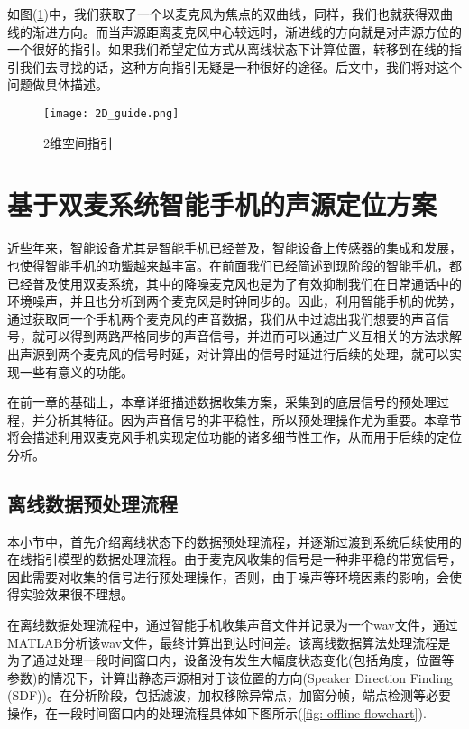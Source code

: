 \documentclass[winfonts,oneside]{njuthesis}
\begin{document}
		如图(\ref{fig: 2D_guide})中，我们获取了一个以麦克风为焦点的双曲线，同样，我们也就获得双曲线的渐进方向。而当声源距离麦克风中心较远时，渐进线的方向就是对声源方位的一个很好的指引。如果我们希望定位方式从离线状态下计算位置，转移到在线的指引我们去寻找的话，这种方向指引无疑是一种很好的途径。后文中，我们将对这个问题做具体描述。
		
		\begin{figure}[H]
			\centering
			\texttt{[image: 2D\_guide.png]} 
			\caption{2维空间指引}
			\label{fig: 2D_guide}
		\end{figure}
	
\chapter{基于双麦系统智能手机的声源定位方案}\label{chapter_work}
	
	近些年来，智能设备尤其是智能手机已经普及，智能设备上传感器的集成和发展，也使得智能手机的功螚越来越丰富。在前面我们已经简述到现阶段的智能手机，都已经普及使用双麦系统，其中的降噪麦克风也是为了有效抑制我们在日常通话中的环境噪声，并且也分析到两个麦克风是时钟同步的。因此，利用智能手机的优势，通过获取同一个手机两个麦克风的声音数据，我们从中过滤出我们想要的声音信号，就可以得到两路严格同步的声音信号，并进而可以通过广义互相关的方法求解出声源到两个麦克风的信号时延，对计算出的信号时延进行后续的处理，就可以实现一些有意义的功能\cite{zhouxin}。
	
	在前一章的基础上，本章详细描述数据收集方案，采集到的底层信号的预处理过程，并分析其特征。因为声音信号的非平稳性，所以预处理操作尤为重要。本章节将会描述利用双麦克风手机实现定位功能的诸多细节性工作，从而用于后续的定位分析。
	
	\section{离线数据预处理流程}
	
		本小节中，首先介绍离线状态下的数据预处理流程，并逐渐过渡到系统后续使用的在线指引模型的数据处理流程。由于麦克风收集的信号是一种非平稳的带宽信号，因此需要对收集的信号进行预处理操作，否则，由于噪声等环境因素的影响，会使得实验效果很不理想。
		
		在离线数据处理流程中，通过智能手机收集声音文件并记录为一个wav文件，通过MATLAB分析该wav文件，最终计算出到达时间差。该离线数据算法处理流程是为了通过处理一段时间窗口内，设备没有发生大幅度状态变化(包括角度，位置等参数)的情况下，计算出静态声源相对于该位置的方向(Speaker Direction Finding (SDF))。在分析阶段，包括滤波，加权移除异常点，加窗分帧，端点检测等必要操作，在一段时间窗口内的处理流程具体如下图所示(\ref{fig: offline-flowchart}).
		
\end{document}
